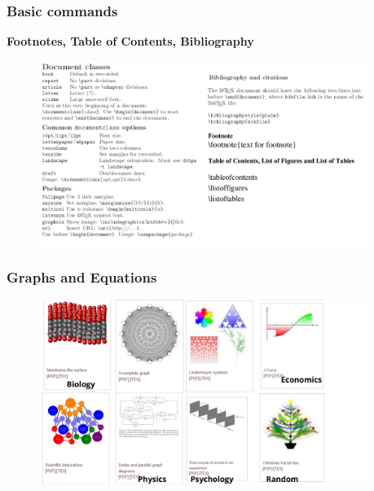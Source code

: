 \documentclass{beamer}
\begin{document}
\begin{frame}
	\frametitle<presentation>{Basic \textbf{commands}}
	\begin{block}{\textbf{Footnotes, Table of Contents, Bibliography}}
		\begin{figure}
		\centering
			\includegraphics[height=6cm]{figures/basiccommands.pdf}
		\label{fig:texfile}
	\end{figure}
 	\end{block}
\end{frame}

\begin{frame}
	\frametitle<presentation>{Graphs and Equations}
		\begin{figure}
		\centering
			\includegraphics[height=6cm]{figures/graphs.pdf}
		\label{fig:graphs}
	\end{figure}
\end{frame}
\end{document}
